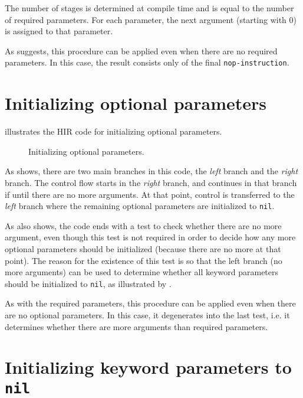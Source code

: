 The number of stages is determined at compile time and is equal to the
number of required parameters.  For each parameter, the next argument
(starting with $0$) is assigned to that parameter.

As  suggests, this procedure can be
applied even when there are no required parameters.  In this case, the
result consists only of the final \texttt{nop-instruction}.

\section{Initializing optional parameters}

 illustrates the HIR code
for initializing optional parameters.

\begin{figure}
\begin{center}
\end{center}
\caption{\label{fig-initialize-optional-parameters}
Initializing optional parameters.}
\end{figure}

As  shows, there are two
main branches in this code, the \emph{left} branch and the
\emph{right} branch.  The control flow starts in the \emph{right}
branch, and continues in that branch if until there are no more
arguments.  At that point, control is transferred to the \emph{left}
branch where the remaining optional parameters are initialized to
\texttt{nil}.

As  also shows, the code
ends with a test to check whether there are no more argument, even
though this test is not required in order to decide how any more
optional parameters should be initialized (because there are no more
at that point).  The reason for the existence of this test is so that
the left branch (no more arguments) can be used to determine whether
all keyword parameters should be initialized to \texttt{nil}, as
illustrated by .

As with the required parameters, this procedure can be applied even
when there are no optional parameters.  In this case, it degenerates
into the last test, i.e. it determines whether there are more
arguments than required parameters.

\section{Initializing keyword parameters to \texttt{nil}}

